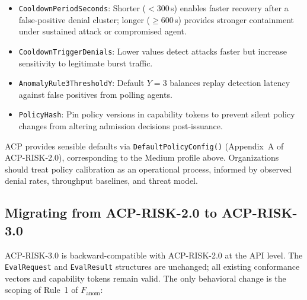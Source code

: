 \documentclass[11pt]{article}
\theoremstyle{definition}
\begin{document}
\begin{itemize}[noitemsep]
  \item \texttt{CooldownPeriodSeconds}: Shorter ($<300$\,s) enables faster recovery
    after a false-positive denial cluster; longer ($\geq600$\,s) provides stronger
    containment under sustained attack or compromised agent.
  \item \texttt{CooldownTriggerDenials}: Lower values detect attacks faster but
    increase sensitivity to legitimate burst traffic.
  \item \texttt{AnomalyRule3ThresholdY}: Default $Y=3$ balances replay detection
    latency against false positives from polling agents.
  \item \texttt{PolicyHash}: Pin policy versions in capability tokens to prevent
    silent policy changes from altering admission decisions post-issuance.
\end{itemize}

\noindent ACP provides sensible defaults via \texttt{DefaultPolicyConfig()}
(Appendix~A of ACP-RISK-2.0), corresponding to the Medium profile above.
Organizations should treat policy calibration as an operational process,
informed by observed denial rates, throughput baselines, and threat model.

\subsection{Migrating from ACP-RISK-2.0 to ACP-RISK-3.0}
\label{sec:migration}

ACP-RISK-3.0 is backward-compatible with ACP-RISK-2.0 at the API level.
The \texttt{EvalRequest} and \texttt{EvalResult} structures are unchanged;
all existing conformance vectors and capability tokens remain valid.
The only behavioral change is the scoping of Rule~1 of $F_\text{anom}$:
\end{document}

